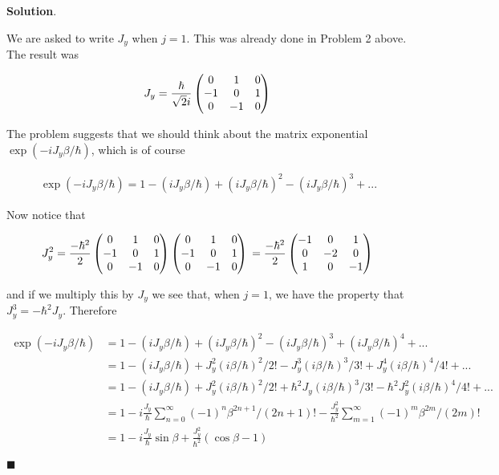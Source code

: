 \documentclass[12pt]{article}
\theoremstyle{definition}
\newenvironment{s}{%
        \begin{trivlist} \item \textbf{Solution}. }{%
            \hspace*{\fill} $\blacksquare$\end{trivlist}}%
\begin{document}
{\begin{s}

We are asked to write $J_{y}$ when $j=1$. This was already done in Problem 2 above. The result was

\begin{equation*}
J_{y} =
\frac{\hbar}{\sqrt{2}i}\begin{pmatrix}
0&1&0\\
-1&0&1\\
0&-1&0
\end{pmatrix}\\ 
\end{equation*}

The problem suggests that we should think about the matrix exponential $\exp(-iJ_{y}\beta/\hbar)$, which is of course

\begin{align*}
\exp(-iJ_{y}\beta/\hbar) = 1 - \left(iJ_{y}\beta/\hbar\right) + \left(iJ_{y}\beta/\hbar\right)^{2} - \left(iJ_{y}\beta/\hbar\right)^{3} + ...
\end{align*}

Now notice that

\begin{equation*}
J_{y}^{2} =
\frac{-\hbar^{2}}{2}\begin{pmatrix}
0&1&0\\
-1&0&1\\
0&-1&0
\end{pmatrix}\begin{pmatrix}
0&1&0\\
-1&0&1\\
0&-1&0
\end{pmatrix}\\ = \frac{-\hbar^{2}}{2}\begin{pmatrix}
-1&0&1\\
0&-2&0\\
1&0&-1
\end{pmatrix}\\
\end{equation*}

and if we multiply this by $J_{y}$ we see that, when $j=1$, we have the property that $J_{y}^{3} = -\hbar^{2}J_{y}$. Therefore

\begin{align*}
\exp(-iJ_{y}\beta/\hbar) &= 1 - \left(iJ_{y}\beta/\hbar\right) + \left(iJ_{y}\beta/\hbar\right)^{2} - \left(iJ_{y}\beta/\hbar\right)^{3} + \left(iJ_{y}\beta/\hbar\right)^{4}+ ...\\
&= 1 - \left(iJ_{y}\beta/\hbar\right) + J_{y}^{2}\left(i\beta/\hbar\right)^{2}/2! - J_{y}^{3}\left(i\beta/\hbar\right)^{3}/3! + J_{y}^{4}\left(i\beta/\hbar\right)^{4}/4! + ...\\
&= 1 - \left(iJ_{y}\beta/\hbar\right) + J_{y}^{2}\left(i\beta/\hbar\right)^{2}/2! + \hbar^{2} J_{y}\left(i\beta/\hbar\right)^{3}/3! - \hbar^{2}J_{y}^{2}\left(i\beta/\hbar\right)^{4}/4!+ ...\\
&= 1 - i\frac{J_{y}}{\hbar}\sum_{n=0}^{\infty}(-1)^{n}\beta^{2n+1}/(2n+1)! - \frac{J_{y}^{2}}{\hbar^{2}}\sum_{m=1}^{\infty}(-1)^{m}\beta^{2m}/(2m)!\\
&=  1 - i\frac{J_{y}}{\hbar}\sin\beta + \frac{J_{y}^{2}}{\hbar^{2}}(\cos\beta-1)
\end{align*}


\end{s}}
\end{document}
